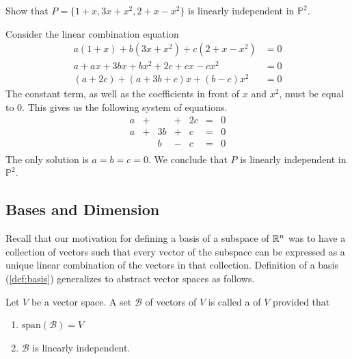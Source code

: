 \documentclass{ximera}
\begin{document}
\begin{example}\label{ex:polyindset} 
Show that $P=\{1 + x, 3x + x^{2}, 2 + x - x^{2}\}$ is linearly independent in $\mathbb{P}^{2}$.

\begin{explanation}
Consider the linear combination equation
\begin{align*}
a(1 + x) + b(3x + x^2) + c(2 + x - x^2) &= 0\\
a+ax+3bx+bx^2+2c+cx-cx^2&=0\\
(a+2c)+(a+3b+c)x+(b-c)x^2&=0
\end{align*}
The constant term, as well as the coefficients in front of $x$ and $x^2$, must be equal to $0$.  This gives us the following system of equations.
\begin{equation*}
\begin{array}{rlrlrcr}
	a & + &      & + & 2c & = & 0 \\
	a & + & 3b & + &  c & = & 0 \\
	    &   &  b & - &  c & = & 0 \\
\end{array}
\end{equation*}
The only solution is $a = b = c = 0$.  We conclude that $P$ is linearly independent in $\mathbb{P}^2$.
\end{explanation}
\end{example}

\subsection*{Bases and Dimension}

Recall that our motivation for defining a basis of a subspace of $\mathbb{R}^n$ was to have a collection of vectors such that every vector of the subspace can be expressed as a unique linear combination of the vectors in that collection.  Definition of a basis (\ref{def:basis}) generalizes to abstract vector spaces as follows.

\begin{definition}\label{def:basisabstract}
Let $V$ be a vector space.  A set $\mathcal{B}$ of vectors of $V$ is called a  of $V$ provided that 
\begin{enumerate}
\item \label{item:defbasis1abstract}
$\mbox{span}(\mathcal{B})=V$ 
\item \label{item:defbasis2abstract}
$\mathcal{B}$ is linearly independent.
\end{enumerate}
\end{definition}
\end{document}
